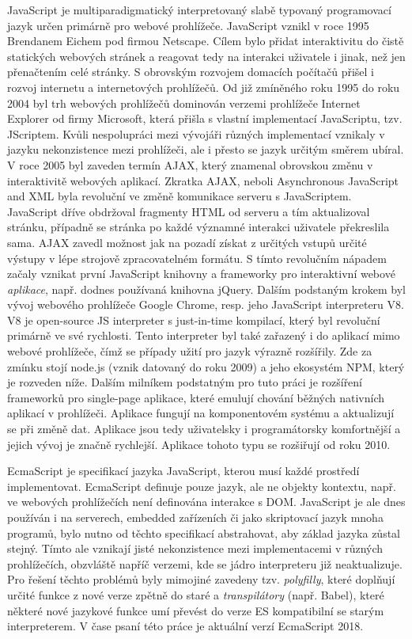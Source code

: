 JavaScript je multiparadigmatický interpretovaný slabě typovaný programovací jazyk určen primárně pro webové prohlížeče. JavaScript vznikl v roce 1995 Brendanem Eichem pod firmou Netscape. Cílem bylo přidat interaktivitu do čistě statických webových stránek a reagovat tedy na interakci uživatele i jinak, než jen přenačtením celé stránky. S obrovským rozvojem domacích počítačů přišel i rozvoj internetu a internetových prohlížečů. Od již zmíněného roku 1995 do roku 2004 byl trh webových prohlížečů dominován verzemi prohlížeče Internet Explorer od firmy Microsoft, která přišla s vlastní implementací JavaScriptu, tzv. JScriptem. Kvůli nespolupráci mezi vývojáři různých implementací vznikaly v jazyku nekonzistence mezi prohlížeči, ale i přesto se jazyk určitým směrem ubíral. V roce 2005 byl zaveden termín AJAX, který znamenal obrovskou změnu v interaktivitě webových aplikací. Zkratka AJAX, neboli Asynchronous JavaScript and XML byla revoluční ve změně komunikace serveru s JavaScriptem. JavaScript dříve obdržoval fragmenty HTML od serveru a tím aktualizoval stránku, případně se stránka po každé významné interakci uživatele překreslila sama. AJAX zavedl možnost jak na pozadí získat z určitých vstupů určité výstupy v lépe strojově zpracovatelném formátu. S tímto revolučním nápadem začaly vznikat první JavaScript knihovny a frameworky pro interaktivní webové \emph{aplikace}, např. dodnes používaná knihovna jQuery. Dalším podstaným krokem byl vývoj webového prohlížeče Google Chrome, resp. jeho JavaScript interpreteru V8. V8 je open-source JS interpreter s just-in-time kompilací, který byl revoluční primárně ve své rychlosti. Tento interpreter byl také zařazený i do aplikací mimo webové prohlížeče, čímž se případy užití pro jazyk výrazně rozšířily. Zde za zmínku stojí node.js (vznik datovaný do roku 2009) a jeho ekosystém NPM, který je rozveden níže. Dalším milníkem podstatným pro tuto práci je rozšíření frameworků pro single-page aplikace, které emulují chování běžných nativních aplikací v prohlížeči. Aplikace fungují na komponentovém systému a aktualizují se při změně dat. Aplikace jsou tedy uživatelsky i programátorsky komfortnější a jejich vývoj je značně rychlejší. Aplikace tohoto typu se rozšiřují od roku 2010.


EcmaScript je specifikací jazyka JavaScript, kterou musí každé prostředí implementovat. EcmaScript definuje pouze jazyk, ale ne objekty kontextu, např. ve webových prohlížečích není definována interakce s DOM. JavaScript je ale dnes používán i na serverech, embedded zařízeních či jako skriptovací jazyk mnoha programů, bylo nutno od těchto specifikací abstrahovat, aby základ jazyka zůstal stejný. Tímto ale vznikají jisté nekonzistence mezi implementacemi v různých prohlížečích, obzvláště napříč verzemi, kde se jádro interpreteru již neaktualizuje. Pro řešení těchto problémů byly mimojiné zavedeny tzv. \emph{polyfilly}, které doplňují určité funkce z nové verze zpětně do staré a \emph{transpilátory} (např. Babel), které některé nové jazykové funkce umí převést do verze ES kompatibilní se starým interpreterem. V čase psaní této práce je aktuální verzí EcmaScript 2018.

